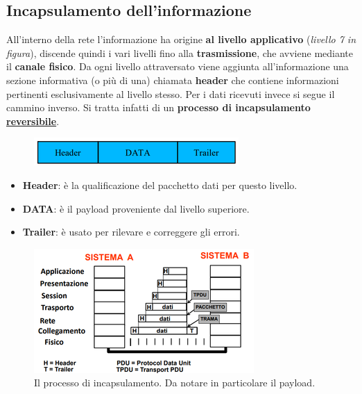 \documentclass[11pt,a4paper,oneside]{book}
\theoremstyle{definition}
\begin{document}
\subsection{Incapsulamento dell'informazione}
All'interno della rete l'informazione ha origine \textbf{al livello
	applicativo} (\textit{livello 7 in figura}), discende quindi i vari livelli fino alla
\textbf{trasmissione}, che avviene mediante il \textbf{canale fisico}.
Da ogni livello attraversato viene aggiunta all'informazione una sezione informativa (o più di una) chiamata \textbf{header} che contiene informazioni pertinenti esclusivamente al livello stesso.
Per i dati ricevuti invece si segue il cammino inverso. Si tratta infatti di un \textbf{processo di incapsulamento \underline{reversibile}}.
\begin{figure}[!h]
	\includegraphics[scale=0.6]{Immagini/Incapsulamento.png}
	\centering
\end{figure}
\begin{itemize}
	\item \textbf{Header}: è la qualificazione del pacchetto dati per questo livello.
	\item \textbf{DATA}: è il payload proveniente dal livello superiore.
	\item \textbf{Trailer}: è usato per rilevare e correggere gli errori.
\end{itemize}
\begin{figure}[!h]
	\includegraphics[scale=0.8]{Immagini/Incaps_2.png}
	\centering
	\caption{Il processo di incapsulamento. Da notare in particolare il payload.}
\end{figure}

\pagebreak
\end{document}
